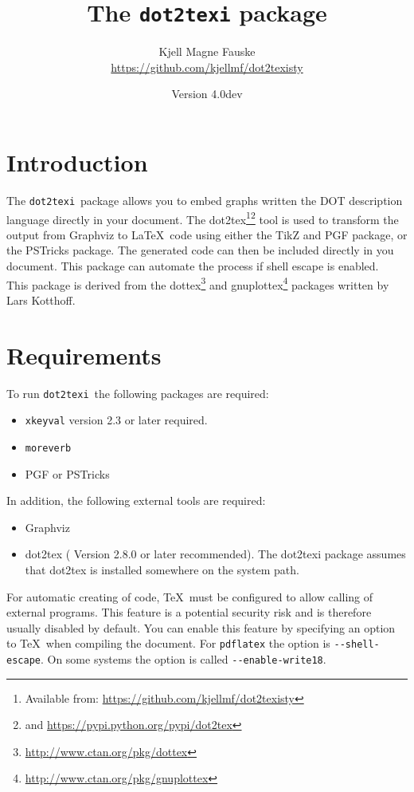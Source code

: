\documentclass[a4paper]{ltxdoc}
\title{The \texttt{dot2texi} package}
\author{Kjell Magne Fauske\\\footnotesize{\url{https://github.com/kjellmf/dot2texisty}}}
\date{Version 4.0dev}
\newcommand\packagename{\texttt{dot2texi}}
\begin{document}
\maketitle

\section{Introduction}

The \packagename\ package allows you to embed graphs written the DOT description language directly in your document. The dot2tex\footnote{Available from: \url{https://github.com/kjellmf/dot2texisty}}\footnote{and \url{https://pypi.python.org/pypi/dot2tex}} tool is used to transform the output from Graphviz to \LaTeX\ code using either the TikZ and PGF package, or the PSTricks package. The generated code can then be included directly in you document. This package can automate the process if shell escape is enabled.
\\

\noindent
This package is derived from the dottex\footnote{\url{http://www.ctan.org/pkg/dottex}} and gnuplottex\footnote{\url{http://www.ctan.org/pkg/gnuplottex}} packages written by Lars Kotthoff.

\section{Requirements}

To run \packagename\ the following packages are required:
\begin{itemize}
    \item \texttt{xkeyval} version 2.3 or later required.
    \item \texttt{moreverb}
    \item PGF or PSTricks
\end{itemize}
In addition, the following external tools are required:
\begin{itemize}
    \item Graphviz
    \item dot2tex ( Version 2.8.0 or later recommended). The dot2texi package assumes that dot2tex is installed somewhere on the system path.
\end{itemize}


\noindent
For automatic creating of code, \TeX\ must be configured to allow calling of external programs. This feature is a potential security risk and is therefore usually disabled by default. You can enable this feature by specifying an option to \TeX\ when compiling the document. For \texttt{pdflatex} the option is \verb|--shell-escape|. On some systems the option is called \verb|--enable-write18|.
\end{document}

